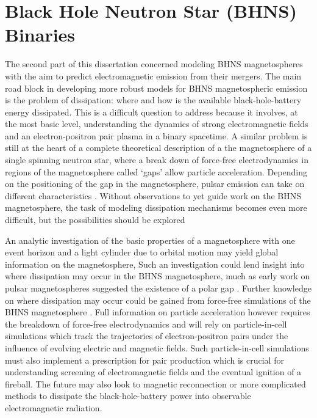\section{Black Hole Neutron Star (BHNS) Binaries }

The second part of this dissertation concerned modeling BHNS magnetospheres
with the aim to predict electromagnetic emission from their mergers.
The main road block in developing more robust models for BHNS magnetospheric
emission is the problem of dissipation: where and how is the available black-hole-battery 
energy dissipated. This is a difficult question to address because it
involves, at the most basic level, understanding the dynamics of strong
electromagnetic fields and an electron-positron pair plasma in a binary
spacetime. A similar problem is still at the heart of a complete theoretical
description of a the magnetosphere of a single spinning neutron star, where a break down
of force-free electrodynamics in regions of the magnetosphere called `gaps'
allow particle acceleration. Depending on the positioning of the gap in the
magnetosphere, pulsar emission can take on different characteristics
\citep[\textit{e.g.},][and references therein]{YukiGaps:2012}. Without observations to
yet guide work on the BHNS magnetosphere, the task of modeling dissipation
mechanisms becomes even more difficult, but the possibilities should be
explored

An analytic investigation of the basic properties of a magnetosphere with one
event horizon and a light cylinder due to orbital motion may yield global
information on the magnetosphere,  Such an investigation could lend insight
into where dissipation may occur in the BHNS magnetosphere, much as early work
on pulsar magnetospheres suggested the existence of a polar gap
\citep{RudSuth:1975}. Further knowledge on where dissipation may occur could
be gained from force-free simulations of the BHNS magnetosphere  \citep[one
such simulation has already been carried out by][]{Paschalidis:2013}.  Full
information on particle acceleration however requires the breakdown of force-free 
electrodynamics and will rely on particle-in-cell  simulations which
track the trajectories of electron-positron pairs under the influence of
evolving electric and magnetic fields. Such particle-in-cell simulations must
also implement a prescription for pair production which is crucial for
understanding screening of electromagnetic fields and the eventual ignition of
a fireball. The future may also look to magnetic reconnection or more
complicated methods to dissipate the black-hole-battery power into observable
electromagnetic radiation.


